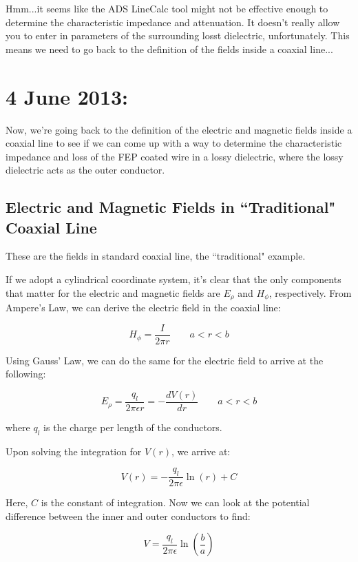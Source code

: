 \documentclass[12pt,onecolumn,titlepage]{article}
\begin{document}
Hmm...it seems like the ADS LineCalc tool might not be effective enough to determine the characteristic impedance and attenuation. It doesn't really allow you to enter in parameters of the surrounding losst dielectric, unfortunately. This means we need to go back to the definition of the fields inside a coaxial line...




\clearpage
\section{4 June 2013:}

\indent \indent Now, we're going back to the definition of the electric and magnetic fields inside a coaxial line to see if we can come up with a way to determine the characteristic impedance and loss of the FEP coated wire in a lossy dielectric, where the lossy dielectric acts as the outer conductor.

\subsection{Electric and Magnetic Fields in ``Traditional" Coaxial Line}
These are the fields in standard coaxial line, the ``traditional" example.

If we adopt a cylindrical coordinate system, it's clear that the only components that matter for the electric and magnetic fields are $E_{\rho}$ and $H_{\phi}$, respectively. From Ampere's Law, we can derive the electric field in the coaxial line:

\[ H_{\phi} = \frac{I}{2 \pi r} \qquad a < r < b \]

Using Gauss' Law, we can do the same for the electric field to arrive at the following:

\[ E_{\rho} = \frac{q_l}{2 \pi \epsilon r} = - \frac{dV(r)}{dr} \qquad a < r < b \]

where $q_l$ is the charge per length of the conductors.

Upon solving the integration for $V(r)$, we arrive at:

\[ V(r) = - \frac{q_l}{2 \pi \epsilon} \ln (r) + C \]

Here, $C$ is the constant of integration. Now we can look at the potential difference between the inner and outer conductors to find:

\[ V = \frac{q_l}{2 \pi \epsilon} \ln \left( \frac{b}{a} \right) \]
\end{document}
